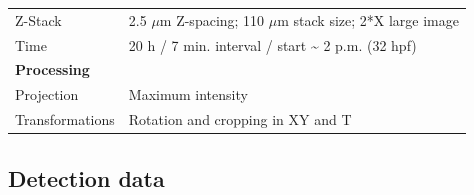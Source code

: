 \documentclass[11pt,singlespacinge,twoside]{reedthesis} %
\begin{document}
\begin{longtable}[]{@{}ll@{}}
\begin{minipage}[t]{0.21\columnwidth}
Z-Stack\strut
\end{minipage} & \begin{minipage}[t]{0.73\columnwidth}\raggedright
2.5 \(\mu\)m Z-spacing; 110 \(\mu\)m stack size; 2*X large image\strut
\end{minipage}\tabularnewline
\begin{minipage}[t]{0.21\columnwidth}\raggedright
Time\strut
\end{minipage} & \begin{minipage}[t]{0.73\columnwidth}\raggedright
20 h / 7 min. interval / start \textasciitilde{} 2 p.m. (32 hpf)\strut
\end{minipage}\tabularnewline
\begin{minipage}[t]{0.21\columnwidth}\raggedright
\textbf{Processing}\strut
\end{minipage} & \begin{minipage}[t]{0.73\columnwidth}\raggedright
\strut
\end{minipage}\tabularnewline
\begin{minipage}[t]{0.21\columnwidth}\raggedright
Projection\strut
\end{minipage} & \begin{minipage}[t]{0.73\columnwidth}\raggedright
Maximum intensity\strut
\end{minipage}\tabularnewline
\begin{minipage}[t]{0.21\columnwidth}\raggedright
Transformations\strut
\end{minipage} & \begin{minipage}[t]{0.73\columnwidth}\raggedright
Rotation and cropping in XY and T\strut
\end{minipage}\tabularnewline
\bottomrule
\end{longtable}
\hypertarget{detect-data}{%
\subsection{Detection data}\label{detect-data}}
\end{document}
